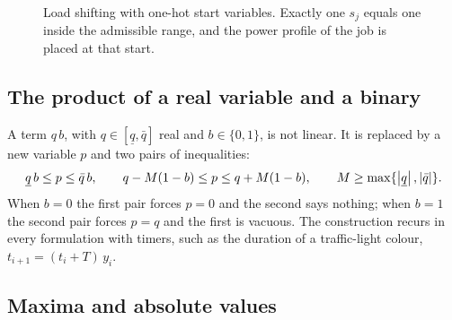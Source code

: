 \begin{figure}[t]
\centering
{}
\caption{Load shifting with one-hot start variables. Exactly one $s_j$ equals one inside the
admissible range, and the power profile of the job is placed at that start.}
\label{fig:onehot}
\end{figure}

\subsection{The product of a real variable and a binary}
\label{sec:product}

A term $q\,b$, with $q \in [\underline q, \bar q]$ real and $b \in \{0,1\}$, is not linear. It
is replaced by a new variable $p$ and two pairs of inequalities:
\begin{equation}
  \underline q\, b \le p \le \bar q\, b, \qquad
  q - M(1-b) \le p \le q + M(1-b), \qquad M \ge \max\{\left\lvert \underline q \right\rvert, \left\lvert \bar q \right\rvert\} .
  \label{eq:product}
\end{equation}
When $b = 0$ the first pair forces $p = 0$ and the second says nothing; when $b = 1$ the second
pair forces $p = q$ and the first is vacuous. The construction recurs in every formulation with
timers, such as the duration of a traffic-light colour, $t_{i+1} = (t_i + T)\,y_i$.

\subsection{Maxima and absolute values}


